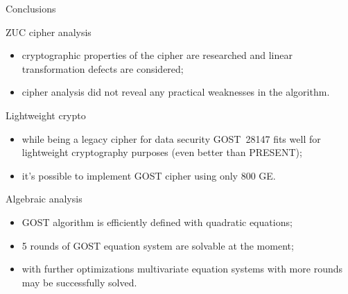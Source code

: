 \documentclass[10pt, ucs]{beamer}
\begin{document}
\begin{frame}{Conclusions}
    \small
    \begin{block}{ZUC cipher analysis}
        \begin{itemize}
            \item cryptographic properties of the cipher are researched and
                linear transformation defects are considered;
            \item cipher analysis did not reveal any practical
                weaknesses in the algorithm.
        \end{itemize}
    \end{block}

    \begin{block}{Lightweight crypto}
        \begin{itemize}
            \item while being a legacy cipher for data security GOST~28147 fits
                well for lightweight cryptography purposes (even better than PRESENT);
            \item it's possible to implement GOST cipher using only 800 GE.
        \end{itemize}
    \end{block}

    \begin{block}{Algebraic analysis}
        \begin{itemize}
            \item GOST algorithm is efficiently defined with quadratic equations;
            \item 5 rounds of GOST equation system are solvable at the moment;
            \item with further optimizations multivariate equation systems with
                more rounds may be successfully solved.
        \end{itemize} 
    \end{block}
\end{frame}
\end{document}
